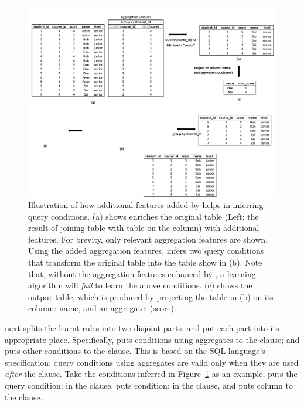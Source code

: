 \begin{figure}[t]
  \centering
  \includegraphics[scale=0.65]{fullexample}
  \vspace*{-5.0ex}\caption {{\label{fig:fullexample}
  Illustration of how additional features added by \ourtool
  helps in inferring query conditions. (a) shows \ourtool
  enriches the original table (Left: the
  result of joining table  with table
   on the  column)
  with additional features. For brevity, only relevant
  aggregation features are shown. Using the added aggregation
  features, \ourtool infers two query conditions that
  transform the original table into the table show in (b).
  Note that, without the aggregation features enhanced by
  \ourtool, a learning algorithm will \textit{fail} to learn the above conditions.
  (c) shows the output table, which is produced by projecting the
   table in (b)
  on its column: name, and an aggregate: (score).
}}

\end{figure}


\ourtool next splits the learnt rules into two disjoint parts:
and put each part into its appropriate place.
Specifically, \ourtool puts conditions
using aggregates to the 
clause; and puts other conditions to the  clause.
This is based on the SQL language's specification:
query conditions using aggregates are valid only when they
are used \textit{after} the  clause.
Take the conditions inferred in Figure~\ref{fig:fullexample}
as an example, \ourtool puts the query
condition: 
in the  clause,
puts condition: 
in the  clause, and puts
column  to the  clause.

